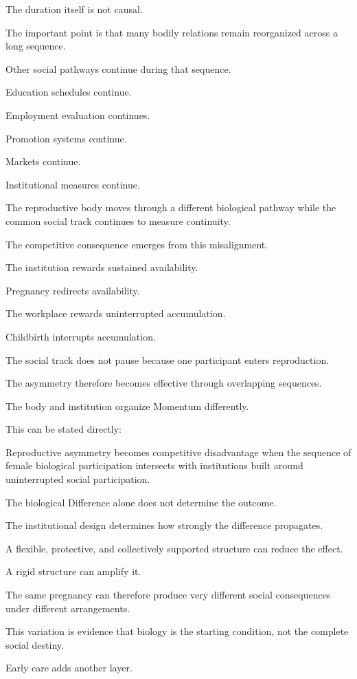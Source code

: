 The duration itself is not causal.

The important point is that many bodily relations remain reorganized across a long sequence.

Other social pathways continue during that sequence.

Education schedules continue.

Employment evaluation continues.

Promotion systems continue.

Markets continue.

Institutional measures continue.

The reproductive body moves through a different biological pathway while the common social track continues to measure continuity.

The competitive consequence emerges from this misalignment.

The institution rewards sustained availability.

Pregnancy redirects availability.

The workplace rewards uninterrupted accumulation.

Childbirth interrupts accumulation.

The social track does not pause because one participant enters reproduction.

The asymmetry therefore becomes effective through overlapping sequences.

The body and institution organize Momentum differently.

This can be stated directly:

Reproductive asymmetry becomes competitive disadvantage when the sequence of female biological participation intersects with institutions built around uninterrupted social participation.

The biological Difference alone does not determine the outcome.

The institutional design determines how strongly the difference propagates.

A flexible, protective, and collectively supported structure can reduce the effect.

A rigid structure can amplify it.

The same pregnancy can therefore produce very different social consequences under different arrangements.

This variation is evidence that biology is the starting condition, not the complete social destiny.

Early care adds another layer.

